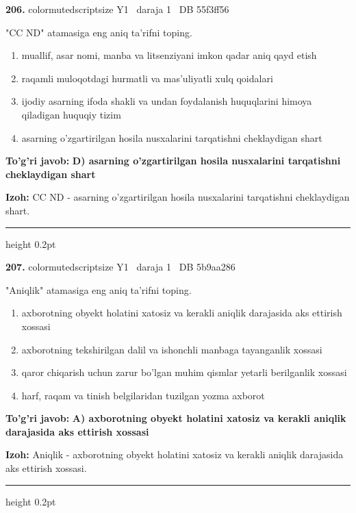 \documentclass[10pt,a4paper,oneside]{article}
\begin{document}
\noindent\textbf{\color{ink}206.}  {color{muted}scriptsize Y1 \textbullet\ daraja 1 \textbullet\ DB 55f3ff56}
\par
"CC ND" atamasiga eng aniq ta'rifni toping.
\begin{enumerate}[label=\Alph*),leftmargin=9mm]
\item muallif, asar nomi, manba va litsenziyani imkon qadar aniq qayd etish
\item raqamli muloqotdagi hurmatli va mas'uliyatli xulq qoidalari
\item ijodiy asarning ifoda shakli va undan foydalanish huquqlarini himoya qiladigan huquqiy tizim
\item asarning o'zgartirilgan hosila nusxalarini tarqatishni cheklaydigan shart
\end{enumerate}
\begin{tcolorbox}[enhanced,breakable,colback=teal!4,colframe=teal!50!black,boxrule=0.5pt,arc=1.1mm,left=3mm,right=3mm,top=1.7mm,bottom=1.7mm,before skip=2mm,after skip=2mm]
\textbf{\color{teal}To'g'ri javob:} \textbf{D) asarning o'zgartirilgan hosila nusxalarini tarqatishni cheklaydigan shart}
\par\smallskip
\textbf{Izoh:} CC ND - asarning o'zgartirilgan hosila nusxalarini tarqatishni cheklaydigan shart.
\end{tcolorbox}
\vspace{2mm}\hrule height 0.2pt \vspace{3mm}

\noindent\textbf{\color{ink}207.}  {color{muted}scriptsize Y1 \textbullet\ daraja 1 \textbullet\ DB 5b9aa286}
\par
"Aniqlik" atamasiga eng aniq ta'rifni toping.
\begin{enumerate}[label=\Alph*),leftmargin=9mm]
\item axborotning obyekt holatini xatosiz va kerakli aniqlik darajasida aks ettirish xossasi
\item axborotning tekshirilgan dalil va ishonchli manbaga tayanganlik xossasi
\item qaror chiqarish uchun zarur bo'lgan muhim qismlar yetarli berilganlik xossasi
\item harf, raqam va tinish belgilaridan tuzilgan yozma axborot
\end{enumerate}
\begin{tcolorbox}[enhanced,breakable,colback=teal!4,colframe=teal!50!black,boxrule=0.5pt,arc=1.1mm,left=3mm,right=3mm,top=1.7mm,bottom=1.7mm,before skip=2mm,after skip=2mm]
\textbf{\color{teal}To'g'ri javob:} \textbf{A) axborotning obyekt holatini xatosiz va kerakli aniqlik darajasida aks ettirish xossasi}
\par\smallskip
\textbf{Izoh:} Aniqlik - axborotning obyekt holatini xatosiz va kerakli aniqlik darajasida aks ettirish xossasi.
\end{tcolorbox}
\vspace{2mm}\hrule height 0.2pt \vspace{3mm}
\end{document}
